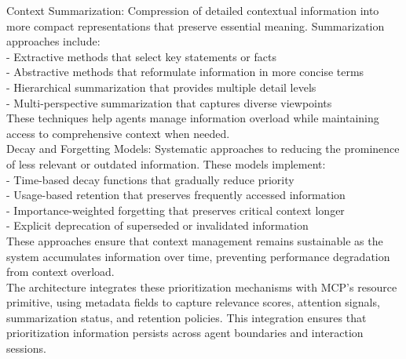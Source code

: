 Context Summarization: Compression of detailed contextual information into more compact representations that preserve essential meaning. Summarization approaches include:\\ \newline
- Extractive methods that select key statements or facts\\ \newline
- Abstractive methods that reformulate information in more concise terms\\ \newline
- Hierarchical summarization that provides multiple detail levels\\ \newline
- Multi-perspective summarization that captures diverse viewpoints\\ \newline
These techniques help agents manage information overload while maintaining access to comprehensive context when needed.\\ \newline
Decay and Forgetting Models: Systematic approaches to reducing the prominence of less relevant or outdated information. These models implement:\\ \newline
- Time-based decay functions that gradually reduce priority\\ \newline
- Usage-based retention that preserves frequently accessed information\\ \newline
- Importance-weighted forgetting that preserves critical context longer\\ \newline
- Explicit deprecation of superseded or invalidated information\\ \newline
These approaches ensure that context management remains sustainable as the system accumulates information over time, preventing performance degradation from context overload.\\ \newline
The architecture integrates these prioritization mechanisms with MCP's resource primitive, using metadata fields to capture relevance scores, attention signals, summarization status, and retention policies. This integration ensures that prioritization information persists across agent boundaries and interaction sessions.\\
